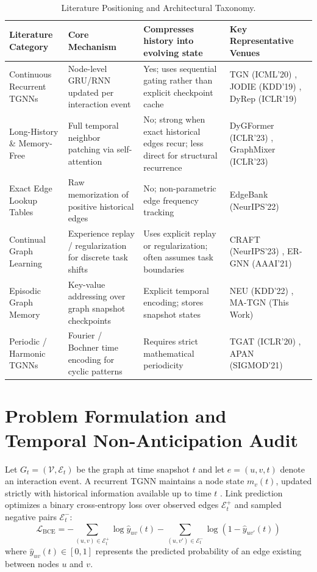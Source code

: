 \documentclass[conference]{IEEEtran}
\begin{document}
\begin{table}[t]
\caption{Literature Positioning and Architectural Taxonomy.}
\label{tab:taxonomy}
\centering
\begin{tabular}{p{3.5cm}p{4.2cm}p{4.2cm}p{4.5cm}}
\toprule
\textbf{Literature Category} & \textbf{Core Mechanism} & \textbf{Compresses history into evolving state} & \textbf{Key Representative Venues} \\
\midrule
Continuous Recurrent TGNNs & Node-level GRU/RNN updated per interaction event & Yes; uses sequential gating rather than explicit checkpoint cache & TGN (ICML'20) \cite{rossi2020tgn}, JODIE (KDD'19) \cite{kumar2019jodie}, DyRep (ICLR'19) \cite{trivedi2019dyrep} \\
Long-History \& Memory-Free & Full temporal neighbor patching via self-attention & No; strong when exact historical edges recur; less direct for structural recurrence & DyGFormer (ICLR'23) \cite{yu2023towards}, GraphMixer (ICLR'23) \cite{cong2023do} \\
Exact Edge Lookup Tables & Raw memorization of positive historical edges & No; non-parametric edge frequency tracking & EdgeBank (NeurIPS'22) \cite{poursafaei2022towards} \\
Continual Graph Learning & Experience replay / regularization for discrete task shifts & Uses explicit replay or regularization; often assumes task boundaries \cite{zhang2024continual, kou2020continual, kirkpatrick2017overcoming} & CRAFT (NeurIPS'23) \cite{sankar2023future}, ER-GNN (AAAI'21) \cite{zhou2021overcoming} \\
Episodic Graph Memory & Key-value addressing over graph snapshot checkpoints & Explicit temporal encoding; stores snapshot states \cite{wang2025recurrent} & NEU (KDD'22) \cite{zhang2022neu}, MA-TGN (This Work) \\
Periodic / Harmonic TGNNs & Fourier / Bochner time encoding for cyclic patterns & Requires strict mathematical periodicity & TGAT (ICLR'20) \cite{xu2020tgat}, APAN (SIGMOD'21) \cite{wang2021apan} \\
\bottomrule
\end{tabular}
\end{table}

\section{Problem Formulation and Temporal Non-Anticipation Audit}
Let $G_t=(\mathcal{V},\mathcal{E}_t)$ be the graph at time snapshot $t$ and let $e=(u,v,t)$ denote an interaction event. A recurrent TGNN maintains a node state $m_v(t)$, updated strictly with historical information available up to time $t$ \cite{rossi2020tgn, trivedi2019dyrep}. Link prediction optimizes a binary cross-entropy loss over observed edges $\mathcal{E}_t^+$ and sampled negative pairs $\mathcal{E}_t^-$:
\begin{equation}
\label{eq:bce_loss}
\mathcal{L}_{\text{BCE}} = -\sum_{(u, v) \in \mathcal{E}_t^+} \log \hat{y}_{uv}(t) - \sum_{(u, v') \in \mathcal{E}_t^-} \log \left(1 - \hat{y}_{uv'}(t)\right)
\end{equation}
where $\hat{y}_{uv}(t) \in [0, 1]$ represents the predicted probability of an edge existing between nodes $u$ and $v$.
\end{document}
